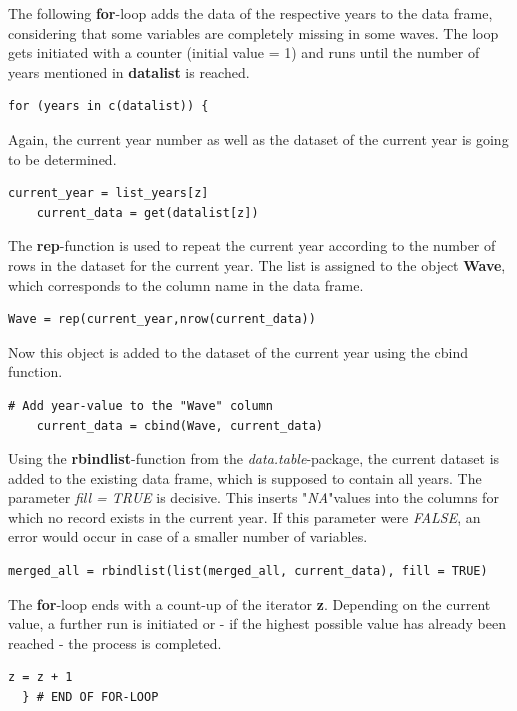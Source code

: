 \documentclass[a4paper]{article}
\begin{document}
The following \textbf{for}-loop adds the data of the respective years to the data frame, considering that some variables are completely missing in some waves. The loop gets initiated with a counter (initial value = 1) and runs until the number of years mentioned in \textbf{datalist} is reached.
\begin{lstlisting}[firstnumber=77]
  for (years in c(datalist)) {
\end{lstlisting}
Again, the current year number as well as the dataset of the current year is going to be determined.
\begin{lstlisting}[firstnumber=79]
    current_year = list_years[z]
    current_data = get(datalist[z])
\end{lstlisting}

The \textbf{rep}-function is used to repeat the current year according to the number of rows in the dataset for the current year. The list is assigned to the object \textbf{Wave}, which corresponds to the column name in the data frame.
\begin{lstlisting}[firstnumber=83]
    Wave = rep(current_year,nrow(current_data))
\end{lstlisting}

Now this object is added to the dataset of the current year using the cbind function.
\begin{lstlisting}[firstnumber=85]
    # Add year-value to the "Wave" column
    current_data = cbind(Wave, current_data)
\end{lstlisting}

Using the \textbf{rbindlist}-function from the \textit{data.table}-package, the current dataset is added to the existing data frame, which is supposed to contain all years. The parameter \textit{fill = TRUE} is decisive. This inserts "\textit{NA}"values into the columns for which no record exists in the current year. If this parameter were \textit{FALSE}, an error would occur in case of a smaller number of variables.
\begin{lstlisting}[firstnumber=87]
    merged_all = rbindlist(list(merged_all, current_data), fill = TRUE)
\end{lstlisting}

The \textbf{for}-loop ends with a count-up of the iterator \textbf{z}. Depending on the current value, a further run is initiated or - if the highest possible value has already been reached - the process is completed.
\begin{lstlisting}[firstnumber=89]
    z = z + 1
  } # END OF FOR-LOOP
\end{lstlisting}
\end{document}

